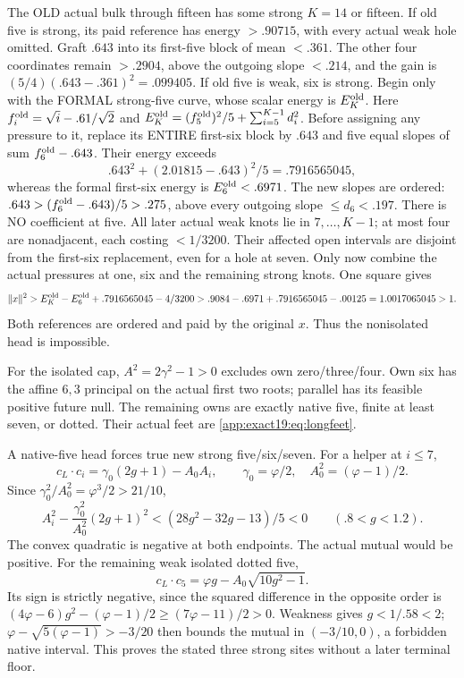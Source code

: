 \documentclass[11pt]{article}
\theoremstyle{definition}
\theoremstyle{remark}
\begin{document}
The OLD actual bulk through fifteen
has some strong \(K=14\) or fifteen.
If old five is strong, its paid
reference has energy \(>.90715\),
with every actual weak hole omitted.
Graft
\(.643\) into its first-five block
of mean \(<.361\).
The other four coordinates remain
\(>.2904\), above the outgoing
slope \(<.214\), and the gain is
\((5/4)(.643-.361)^2=.099405\).
If old five is weak, six is strong.
Begin only with the FORMAL
strong-five curve, whose scalar
energy is \(E_K^{\rm old}\).
Here \(f_i^{\rm old}=\sqrt i-.61/\sqrt2\)
and \(E_K^{\rm old}=(f_5^{\rm old})^2/5
+\sum_{i=5}^{K-1}d_i^2\).
Before assigning any pressure to
it, replace its ENTIRE first-six
block by \(.643\) and five equal
slopes of sum \(f_6^{\rm old}-.643\).
Their energy exceeds
\[
 .643^2+(2.01815-.643)^2/5=.7916565045 ,
\]
whereas the formal first-six
energy is \(E_6^{\rm old}<.6971\).
The new slopes are ordered:
\(.643>(f_6^{\rm old}-.643)/5>.275\),
above every outgoing slope
\(\le d_6<.197\).
There is NO coefficient at five.
All later actual weak knots lie
in \(7,\ldots,K-1\); at most four
are nonadjacent, each costing
\(<1/3200\).
Their affected open intervals
are disjoint from the first-six
replacement, even for a hole
at seven.
Only now combine the actual
pressures at one, six and the
remaining strong knots.
One square gives
\[
 \|x\|^2>
 E_K^{\rm old}-E_6^{\rm old}
      +.7916565045-4/3200
 >.9084-.6971+.7916565045-.00125
       =1.0017065045>1 .
\]
Both references are ordered and
paid by the original \(x\).
Thus the nonisolated head is
impossible.

For the isolated cap,
\(A^2=2\gamma^2-1>0\) excludes
own zero/three/four.
Own six has the affine \(6,3\)
principal on the actual first two
roots; parallel has its feasible
positive future null.
The remaining owns are exactly
native five, finite at least seven,
or dotted.
Their actual feet are
\eqref{app:exact19:eq:longfeet}.

A native-five head forces true
new strong five/six/seven.
For a helper at \(i\le7\),
\[
 c_L\cdot c_i=\gamma_0(2g+1)-A_0A_i,\qquad
       \gamma_0=\varphi/2,\quad A_0^2=(\varphi-1)/2 .
\]
Since \(\gamma_0^2/A_0^2=\varphi^3/2>21/10\),
\[
 A_i^2-\frac{\gamma_0^2}{A_0^2}(2g+1)^2
                   <(28g^2-32g-13)/5<0
                  \qquad(.8<g<1.2).
\]
The convex quadratic is negative
at both endpoints.
The actual mutual would be
positive.
For the remaining weak isolated
dotted five,
\[
 c_L\cdot c_5=\varphi g-A_0\sqrt{10g^2-1}.
\]
Its sign is strictly negative,
since the squared difference in
the opposite order is
\((4\varphi-6)g^2-(\varphi-1)/2
\ge(7\varphi-11)/2>0\).
Weakness gives \(g<1/.58<2\);
\(\varphi-\sqrt{5(\varphi-1)}>-3/20\)
then bounds the mutual in
\((-3/10,0)\), a forbidden native
interval.
This proves the stated three
strong sites without a later
terminal floor.
\end{document}
